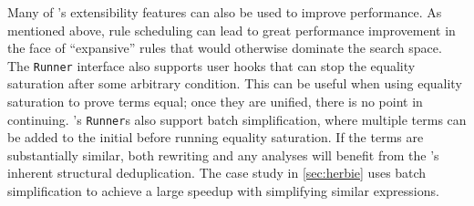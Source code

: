 Many of \egg's extensibility features can also be used to improve performance.
As mentioned above, rule scheduling can lead to great performance improvement in
  the face of ``expansive'' rules that would otherwise dominate the search
  space.
The \texttt{Runner} interface also supports user hooks that can stop
  the equality saturation after some arbitrary condition.
This can be useful when using equality saturation to prove terms equal; once
  they are unified, there is no point in continuing.
\label{sec:egg-batched}
\egg's \texttt{Runner}s also support batch simplification, where multiple terms
  can be added to the initial \egraph before running equality saturation.
If the terms are substantially similar, both rewriting and any \eclass analyses
  will benefit from the \egraph's inherent structural deduplication.
The case study in \autoref{sec:herbie} uses batch simplification to achieve
  a large speedup with simplifying similar expressions.

